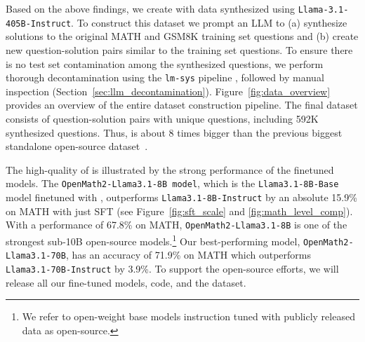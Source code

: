 Based on the above findings, we create \dataset with data synthesized using \texttt{Llama-3.1-405B-Instruct}. 
To construct this dataset we prompt an LLM to (a) synthesize solutions to the original MATH and GSM8K training set questions and (b) create new question-solution pairs similar to the training set questions.   
To ensure there is no test set contamination among the synthesized questions, we perform thorough decontamination using the \texttt{lm-sys} pipeline  \citep{yang2023rethinkingbenchmarkcontaminationlanguage}, followed by manual inspection (Section~\ref{sec:llm_decontamination}). 
Figure~\ref{fig:data_overview} provides an overview of the entire dataset construction pipeline. 
The final dataset consists of \datasize question-solution pairs with \uniqquesns unique questions, including 592K synthesized questions. Thus, \dataset is about 8 times bigger than the previous biggest standalone open-source dataset~\citep{toshniwal2024openmathinstruct}. 

The high-quality of \dataset is illustrated by the strong performance of the finetuned models. The \texttt{OpenMath2-Llama3.1-8B model}, which is the \texttt{Llama3.1-8B-Base} model finetuned with \dataset, outperforms \texttt{Llama3.1-8B-Instruct} by an absolute 15.9\% on MATH with just SFT (see Figure~\ref{fig:sft_scale} and \ref{fig:math_level_comp}). 
With a performance of 67.8\% on MATH, \texttt{OpenMath2-Llama3.1-8B} is one of the strongest sub-10B open-source models.\footnote{We refer to open-weight base models instruction tuned with publicly released data as open-source.}  
Our best-performing model, \texttt{OpenMath2-Llama3.1-70B}, has an accuracy of 71.9\% on MATH which outperforms \texttt{Llama3.1-70B-Instruct} by 3.9\%.
To support the open-source efforts, we will release all our fine-tuned models, code, and the \dataset dataset.  

